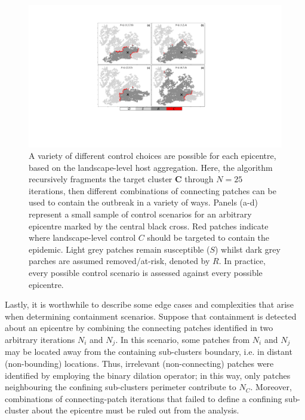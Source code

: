 \begin{figure}
    \centering
    \includegraphics[scale=0.575]{chapter7/figures/figure3-scenario-test.pdf}
    \caption{
    A variety of different control choices are possible for each epicentre, based on the landscape-level host aggregation. Here, the algorithm recursively fragments the target cluster $\mathbf{C}$ through $N=25$ iterations, then different combinations of connecting patches can be used to contain the outbreak in a variety of ways. Panels (a-d) represent a small sample of control scenarios for an arbitrary epicentre marked by the central black cross. Red patches indicate where landscape-level control $C$ should be targeted to contain the epidemic. Light grey patches remain susceptible ($S$) whilst dark grey parches are assumed removed/at-risk, denoted by $R$. In practice, every possible control scenario is assessed against every possible epicentre.
     }
    \label{fig:scenario-expo}
\end{figure}

Lastly, it is worthwhile to describe some edge cases and complexities that arise when determining containment scenarios.
Suppose that containment is detected about an epicentre by combining the connecting patches identified in two arbitrary iterations $N_i$ and $N_j$.
In this scenario, some patches from $N_i$ and $N_j$ may be located away from the containing sub-clusters boundary, i.e. in distant (non-bounding) locations.
Thus, irrelevant (non-connecting) patches were identified by employing the binary dilation operator; in this way, only patches neighbouring the confining sub-clusters perimeter contribute to $N_C$.
Moreover, combinations of connecting-patch iterations that failed to define a confining sub-cluster about the epicentre must be ruled out from the analysis.

\newpage

